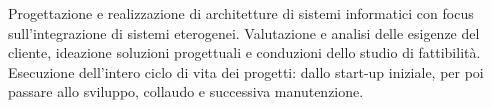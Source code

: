 \begin{cvparagraph}
	Progettazione e realizzazione di architetture di sistemi informatici con focus sull'integrazione di sistemi eterogenei.	Valutazione e analisi delle esigenze del cliente, ideazione soluzioni progettuali e conduzioni dello studio di fattibilità. Esecuzione dell'intero ciclo di vita dei progetti: dallo start-up iniziale, per poi passare allo sviluppo, collaudo e successiva manutenzione.
\end{cvparagraph}